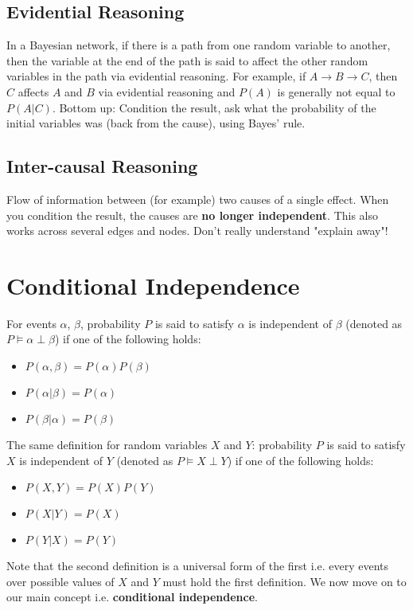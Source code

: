 \subsection{Evidential Reasoning}
In a Bayesian network, if there is a path from one random variable to another, then the variable at the end of the path is said to affect the other random variables in the path via evidential reasoning. For example, if $A \rightarrow B \rightarrow C$, then $C$ affects $A$ and $B$ via evidential reasoning and $P(A)$ is generally not equal to $P(A|C)$.
Bottom up: Condition the result, ask what the probability of the initial variables was (back from the cause), using Bayes' rule.

\subsection{Inter-causal Reasoning}
Flow of information between (for example) two causes of a single effect. When you condition the result, the causes are \textbf{no longer independent}. This also works across several edges and nodes. Don't really understand "explain away"! 


\section{Conditional Independence}
For events $\alpha$, $\beta$, probability $P$ is said to satisfy $\alpha$ is independent of $\beta$ (denoted as $P \models \alpha \perp \beta$) if one of the following holds:
\begin{itemize}
	\item $P(\alpha, \beta) = P(\alpha) P(\beta)$
	\item $P(\alpha | \beta) = P(\alpha)$
	\item $P(\beta  | \alpha) = P(\beta)$
\end{itemize}

The same definition for random variables $X$ and $Y$: probability $P$ is said to satisfy $X$ is independent of $Y$ (denoted as $P \models X \perp Y$) if one of the following holds:
\begin{itemize}
	\item $P(X, Y) = P(X) P(Y)$
	\item $P(X | Y) = P(X)$
	\item $P(Y | X) = P(Y)$
\end{itemize}

Note that the second definition is a universal form of the first i.e. every events over possible values of $X$ and $Y$ must hold the first definition. We now move on to our main concept i.e. \textbf{conditional independence}. 


